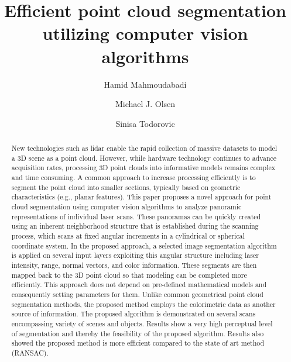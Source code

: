 \documentclass[final,3p,times,twocolumn,authoryear]{elsarticle}
\begin{document}
\begin{frontmatter}



\title{ Efficient point cloud segmentation utilizing computer vision algorithms}


\author[label1]{Hamid Mahmoudabadi}
\author[label1]{Michael J. Olsen}
\author[label1]{Sinisa Todorovic}
\address[label1]{Oregon State University, Corvallis, OR, USA}

\begin{abstract}
New technologies such as lidar enable the rapid collection of massive datasets to model a 3D scene as a point cloud. However, while hardware technology continues to advance acquisition rates, processing 3D point clouds into informative models remains complex and time consuming. A common approach to increase processing efficiently is to segment the point cloud into smaller sections, typically based on geometric characteristics (e.g., planar features). This paper proposes a novel approach for point cloud segmentation using computer vision algorithms to analyze panoramic representations of individual laser scans. These panoramas can be quickly created using an inherent neighborhood structure that is established during the scanning process, which scans at fixed angular increments in a cylindrical or spherical coordinate system. In the proposed approach, a selected image segmentation algorithm is applied on several input layers exploiting this angular structure including laser intensity, range, normal vectors, and color information. These segments are then mapped back to the 3D point cloud so that modeling can be completed more efficiently. This approach does not depend on pre-defined mathematical models and consequently setting parameters for them. Unlike common geometrical point cloud segmentation methods, the proposed method employs the colorimetric data as another source of information. The proposed algorithm is demonstrated on several scans encompassing variety of scenes and objects. Results show a very high perceptual level of segmentation and thereby the feasibility of the proposed algorithm. Results also showed the proposed method is more efficient compared to the state of art method (RANSAC).  


\end{abstract}
\end{frontmatter}
\end{document}
